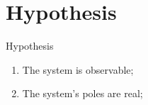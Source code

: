 
\section{Hypothesis}%
\label{sec:hypothesis}

\begin{slide}{Hypothesis}
  \begin{enumerate}
    \item The system is observable;\label{item:hypo1}
    \item The system's poles are real;\label{item:hypo2}
  \end{enumerate}
\end{slide}
